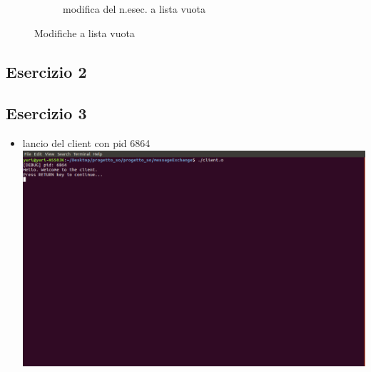 \begin{figure}
\begin{subfigure}[b]{0.6\textwidth}
\caption{modifica del n.esec. a lista vuota}
\end{subfigure}
\caption{Modifiche a lista vuota}
\end{figure}

\subsection{Esercizio 2}
\subsection{Esercizio 3}

\begin{itemize}
\item lancio del client con pid 6864 \\
\includegraphics[scale=0.3]{screenmsg/1_client_6864}


\end{itemize}
